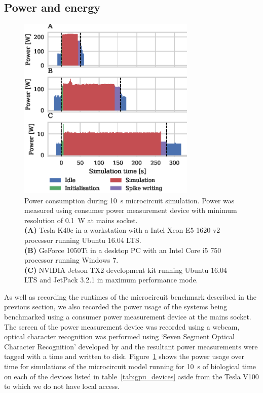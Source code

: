 \documentclass[utf8]{frontiersSCNS} %
\begin{document}
\subsection{Power and energy}
\begin{figure}
    \begin{center}
        \includegraphics[width=85mm]{figures/microcircuit_power}
    \end{center}
    \caption{Power consumption during \SI{10}{\second} microcircuit simulation.
    Power was measured using consumer power measurement device with minimum resolution of \SI{0.1}{\watt} at mains socket.\\
    \textbf{(A)} Tesla K40c in a workstation with a Intel Xeon E5-1620 v2 processor running Ubuntu 16.04 LTS.\\
    \textbf{(B)} GeForce 1050Ti in a desktop PC with an Intel Core i5 750 processor running Windows 7.\\
    \textbf{(C)} NVIDIA Jetson TX2 development kit running Ubuntu 16.04 LTS and JetPack 3.2.1 in maximum performance mode.}
    \label{fig:microcircuit_power}
\end{figure}

As well as recording the runtimes of the microcircuit benchmark described in the previous section, we also recorded the power usage of the systems being benchmarked using a consumer power measurement device at the mains socket.
The screen of the power measurement device was recorded using a webcam, optical character recognition was performed using `Seven Segment Optical Character Recognition' developed by \citet{Auerswald2018} and the resultant power measurements were tagged with a time and written to disk.
Figure~\ref{fig:microcircuit_power} shows the power usage over time for simulations of the microcircuit model running for \SI{10}{\second} of biological time on each of the devices listed in table~\ref{tab:gpu_devices} aside from the Tesla V100 to which we do not have local access.
\end{document}
